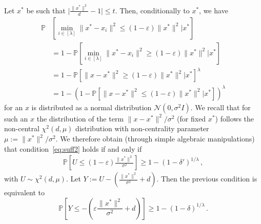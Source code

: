 \begin{subappendices}
\begin{prv*}
Let $x^*$ be such that $\lvert\frac{\lVert x^*\rVert^2}{d}-1\rvert\leq t$. Then, conditionally to $x^*$, we have 
\begin{align*}
  \mathbb{P}&\left[\min_{i\in[\lambda]}\lVert x^*-x_i\rVert^2 \leq \left(1-\varepsilon\right)\lVert x^*\rVert^2\big| x^*\right] \\
  & = 1- \mathbb{P}\left[\min_{i\in[\lambda]}\lVert x^*-x_i\rVert^2 \geq \left(1-\varepsilon\right)\lVert x^*\rVert^2\big|x^*\right]\\
  &=1-\mathbb{P}\left[\lVert x-x^*\rVert^2 \geq \left(1-\varepsilon\right)\lVert x^*\rVert^2\big|x^*\right]^\lambda\\
  &=1-\left(1-\mathbb{P}\left[\lVert x-x^*\rVert^2 \leq \left(1-\varepsilon\right)\lVert x^*\rVert^2\big|x^*\right]\right)^\lambda
\end{align*}
for an $x$ is distributed as a normal distribution $\mathcal{N}(0,\sigma^2 I)$. We recall that for such an $x$ the distribution of the term $\lVert x-x^*\rVert^2/\sigma^2$ (for fixed $x^*$) follows the non-central $\chi^2(d,\mu)$ distribution with non-centrality parameter $\mu:=\lVert x^*\rVert^2/\sigma^2$. We therefore obtain (through simple algebraic manipulations) that condition~\eqref{eq:suff2} holds if and only if 
\begin{align*}
\mathbb{P}\left[U \leq \left(1-\varepsilon\right)\frac{\lVert x^*\rVert^2}{\sigma^2}\right]\geq1-(1-\delta')^{1/\lambda}\,,
\end{align*}
with $U \sim \chi^2(d,\mu)$. %
Let $Y  := U-\left(\frac{\lVert x^*\rVert^2}{\sigma^2}+d\right)$.
Then the previous condition is equivalent to
\begin{equation*}
    \mathbb{P}\left[Y \leq -\left(\varepsilon\frac{\lVert x^*\rVert^2}{\sigma^2}+d\right)\right]\geq1-(1-\delta)^{1/\lambda}\,.
\end{equation*}


\end{prv*}
\end{subappendices}
